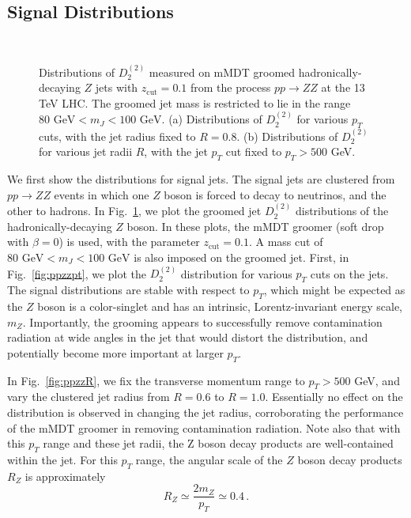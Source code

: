 \documentclass[a4paper,11pt]{article}
\def\zcut{z_{\text{cut}}}
\newcommand{\Dobs}[2]{D_{#1}^{(#2)}}
\DeclareRobustCommand{\Fig}[1]{Fig.~\ref{#1}}
\begin{document}
\subsection{Signal Distributions}

\begin{figure}
\begin{center}
\ \ 
\end{center}
\caption{Distributions of $\Dobs{2}{2}$ measured on mMDT groomed hadronically-decaying $Z$ jets with $\zcut = 0.1$ from the process $pp\to ZZ$ at the 13 TeV LHC.  The groomed jet mass is restricted to lie in the range  $80\text{ GeV} < m_J < 100\text{ GeV}$.  (a) Distributions of $\Dobs{2}{2}$ for various $p_T$ cuts, with the jet radius fixed to $R= 0.8$. (b) Distributions of $\Dobs{2}{2}$ for various jet radii $R$, with the jet $p_T$ cut fixed to $p_T > 500$ GeV.
}
\label{fig:ppzzplots}
\end{figure}

We first show the distributions for signal jets.  The signal jets are clustered from $pp\to ZZ$ events in which one $Z$ boson is forced to decay to neutrinos, and the other to hadrons.  In \Fig{fig:ppzzplots}, we plot the groomed jet $\Dobs{2}{2}$ distributions of the hadronically-decaying $Z$ boson.  In these plots, the mMDT groomer (soft drop with $\beta = 0$) is used, with the parameter $\zcut = 0.1$.  A mass cut of $80\text{ GeV} < m_J < 100\text{ GeV}$ is also imposed on the groomed jet.  First, in \Fig{fig:ppzzpt}, we plot the $\Dobs{2}{2}$ distribution for various $p_T$ cuts on the jets.  The signal distributions are stable with respect to $p_T$, which might be expected as the $Z$ boson is a color-singlet and has an intrinsic, Lorentz-invariant energy scale, $m_Z$.  Importantly, the grooming appears to successfully remove contamination radiation at wide angles in the jet that would distort the distribution, and potentially become more important at larger $p_T$.   

In \Fig{fig:ppzzR}, we fix the transverse momentum range to $p_T > 500$ GeV, and vary the clustered jet radius from $R=0.6$ to $R=1.0$.  Essentially no effect on the distribution is observed in changing the jet radius, corroborating the performance of the mMDT groomer in removing contamination radiation.  Note also that with this $p_T$ range and these jet radii, the Z boson decay products are well-contained within the jet.  For this $p_T$ range, the angular scale of the $Z$ boson decay products $R_Z$ is approximately
\begin{equation}\label{eq:jetrscale}
R_Z \simeq \frac{2m_Z}{p_T}\simeq 0.4\,.
\end{equation}
\end{document}
